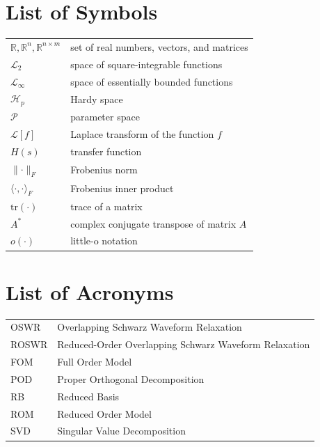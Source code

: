 \documentclass[twoside, 11pt]{report}
\theoremstyle{definition}
\theoremstyle{remark}
\begin{document}
\chapter*{List of Symbols}
\begin{tabular}{ll}
    $\mathbb{R}, \mathbb{R}^{n}, \mathbb{R}^{n\times m}$ & set of real numbers, vectors, and matrices \\
    $\mathcal{L}_{2}$ & space of square-integrable functions \\
    $\mathcal{L}_{\infty}$ & space of essentially bounded functions \\
    $\mathcal{H}_{p}$ & Hardy space \\
    $\mathcal{P}$ & parameter space \\
    $\mathcal{L}[f]$ & Laplace transform of the function $f$ \\
    $H(s)$ & transfer function \\
    $\lVert \cdot \rVert_{F}$ & Frobenius norm \\
    $\langle \cdot, \cdot \rangle_{F}$ & Frobenius inner product \\
    $\mathrm{tr}(\cdot)$ & trace of a matrix \\
    $A^{*}$ & complex conjugate transpose of matrix $A$ \\
    $o(\cdot)$ & little-o notation
\end{tabular}

\chapter*{List of Acronyms}
\begin{tabular}{ll}
    OSWR   & Overlapping Schwarz Waveform Relaxation\\
    ROSWR   & Reduced-Order Overlapping Schwarz Waveform Relaxation\\
    FOM    & Full Order Model \\
    POD    & Proper Orthogonal Decomposition \\
    RB     & Reduced Basis \\
    ROM    & Reduced Order Model \\
    SVD    & Singular Value Decomposition \\
\end{tabular}


\clearpage
{}
\setcounter{page}{1}








\cleardoublepage
{}
\renewcommand{\bibname}{References}


\end{document}
